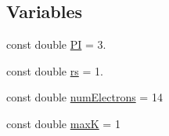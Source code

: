 \subsection*{Variables}
\begin{DoxyCompactItemize}
\item 
const double \hyperlink{kPoints__ordered__FCIQMC_8C_a952eac791b596a61bba0a133a3bb439f}{P\-I} = 3.
\item 
const double \hyperlink{kPoints__ordered__FCIQMC_8C_a363ad74e3d4570cd6bfaa4622e0af0bd}{rs} = 1.
\item 
const double \hyperlink{kPoints__ordered__FCIQMC_8C_a613e167ad809e33c73b70a24822cc6f9}{num\-Electrons} = 14
\item 
const double \hyperlink{kPoints__ordered__FCIQMC_8C_a3617ed292f6cccea83811369c46ca12a}{max\-K} = 1
\end{DoxyCompactItemize}


